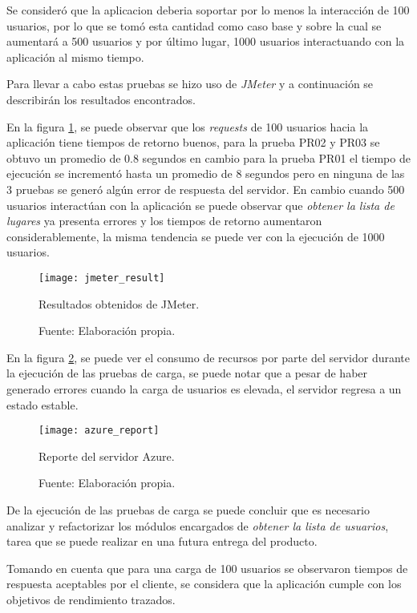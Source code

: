  Se consideró que la aplicacion deberia soportar por lo menos la interacción de 100 usuarios, por lo que se tomó esta cantidad como caso base y sobre la cual se aumentará a 500 usuarios y por último lugar, 1000 usuarios interactuando con la aplicación al mismo tiempo.

  Para llevar a cabo estas pruebas se hizo uso de \emph{JMeter} y a continuación se describirán los resultados encontrados.

  En la figura \ref{fig:jmeter_result}, se puede observar que los \emph{requests} de 100 usuarios hacia la aplicación tiene tiempos de retorno buenos, para la prueba PR02 y PR03 se obtuvo un promedio de 0.8 segundos en cambio para la prueba PR01 el tiempo de ejecución se incrementó hasta un promedio de 8 segundos pero en ninguna de las 3 pruebas se generó algún error de respuesta del servidor. En cambio cuando 500 usuarios interactúan con la aplicación se puede observar que \emph{obtener la lista de lugares} ya presenta errores y los tiempos de retorno aumentaron considerablemente, la misma tendencia se puede ver con la ejecución de 1000 usuarios.


  \begin{figure}[H]
        \begin{center}
          \texttt{[image: jmeter\_result]}

          \caption{Resultados obtenidos de JMeter.}
          \label{fig:jmeter_result}
          \caption*{Fuente: Elaboración propia.}
        \end{center}
  \end{figure}

 En la figura \ref{fig:azure_report}, se puede ver el consumo de recursos por parte del servidor durante la ejecución de las pruebas de carga, se puede notar que a pesar de haber generado errores cuando la carga de usuarios es elevada, el servidor regresa a un estado estable.

  \begin{figure}[H]
        \begin{center}
          \texttt{[image: azure\_report]}

          \caption{Reporte del servidor Azure.}
          \label{fig:azure_report}
          \caption*{Fuente: Elaboración propia.}
        \end{center}
  \end{figure}



  De la ejecución de las pruebas de carga se puede concluir que es necesario analizar y refactorizar los módulos encargados de \emph{obtener la lista de usuarios}, tarea que se puede realizar en una futura entrega del producto.

  Tomando en cuenta que para una carga de 100 usuarios se observaron tiempos de respuesta aceptables por el cliente, se considera que la aplicación cumple con los objetivos de rendimiento trazados.
